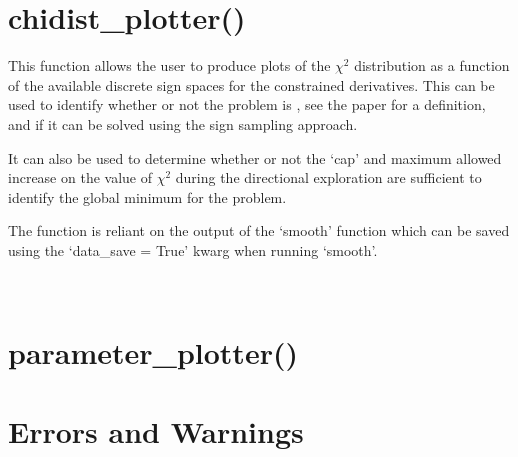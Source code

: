 \documentclass[letterpaper,10pt,english]{sphinxmanual}
\begin{document}
\section{chidist\_plotter()}
\label{\detokenize{source/maxsmooth:module-maxsmooth.chidist_plotter}}\label{\detokenize{source/maxsmooth:chidist-plotter}}
This function allows the user to produce plots of the \({\chi^2}\)
distribution as a function of the available discrete sign spaces for the
constrained derivatives. This can be used to identify whether or not the
problem is , see the  paper for a definition,
and if it can be solved using the sign sampling approach.

It can also be used to determine whether or not the ‘cap’ and maximum allowed
increase on the value of \({\chi^2}\) during the directional exploration
are sufficient to identify the global minimum for the problem.

The function is reliant on the output of the  ‘smooth’ function
which can be saved using the ‘data\_save = True’ kwarg when running ‘smooth’.

\begin{fulllineitems}
\label{\detokenize{source/maxsmooth:maxsmooth.chidist_plotter.chi_plotter}}~
\end{fulllineitems}



\section{parameter\_plotter()}
\label{\detokenize{source/maxsmooth:parameter-plotter}}

\section{Errors and Warnings}
\label{\detokenize{source/maxsmooth:errors-and-warnings}}

\renewcommand{\indexname}{Python Module Index}
\begin{sphinxtheindex}
\let\bigletter\sphinxstyleindexlettergroup
\bigletter{m}
\item\relax{}
\item\relax{}
\item\relax{}
\end{sphinxtheindex}

\renewcommand{\indexname}{Index}
\printindex
\end{document}
